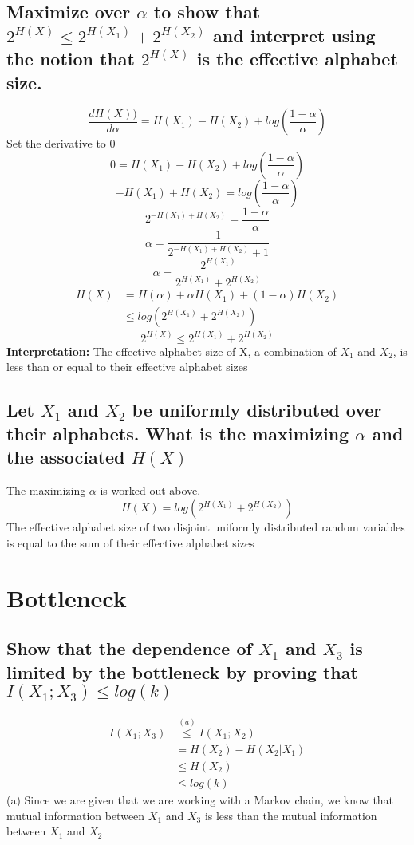 \documentclass[11pt, oneside]{book}   	%
\begin{document}
\subsection{Maximize over $\alpha$ to show that $2^{H(X)} \leq 2^{H(X_1)}+2^{H(X_2)}$ and interpret using the notion that $2^{H(X)}$ is the effective alphabet size.}

$$\frac{dH(X))}{d\alpha} = H(X_1)-H(X_2)+log(\frac{1-\alpha}{\alpha})$$
Set the derivative to 0
$$0 = H(X_1)-H(X_2)+log(\frac{1-\alpha}{\alpha})$$
$$-H(X_1)+H(X_2) = log(\frac{1-\alpha}{\alpha})$$
$$2^{-H(X_1)+H(X_2)} = \frac{1-\alpha}{\alpha}$$
$$\alpha = \frac{1}{2^{-H(X_1)+H(X_2)} + 1}$$
$$\alpha = \frac{2^{H(X_1)}}{2^{H(X_1)} + 2^{H(X_2)}}$$
\begin{equation}
\begin{split}
H(X) & = H(\alpha) + \alpha H(X_1) + (1-\alpha)H(X_2)\\
& \leq log(2^{H(X_1)} + 2^{H(X_2)})
\end{split}
\end{equation}
$$2^{H(X)} \leq 2^{H(X_1)} + 2^{H(X_2)}$$
\textbf{Interpretation:} The effective alphabet size of X, a combination of $X_1$ and $X_2$, is less than or equal to their effective alphabet sizes
\subsection{Let $X_1$ and $X_2$ be uniformly distributed over their alphabets.  What is the maximizing $\alpha$ and the associated $H(X)$}
The maximizing $\alpha$ is worked out above.
$$H(X) = log(2^{H(X_1)} + 2^{H(X_2)})$$
The effective alphabet size of two disjoint uniformly distributed random variables is equal to the sum of their effective alphabet sizes

\section{Bottleneck}
\subsection{Show that the dependence of $X_1$ and $X_3$ is limited by the bottleneck by proving that $I(X_1;X_3) \leq log(k)$}

\begin{equation}
\begin{split}
I(X_1;X_3) & \overset{(a)}{\leq} I(X_1;X_2)\\
& = H(X_2) - H(X_2|X_1)\\
& \leq H(X_2)\\
& \leq log(k)
\end{split}
\end{equation}
(a) Since we are given that we are working with a Markov chain, we know that mutual information between $X_1$ and $X_3$ is less than the mutual information between $X_1$ and $X_2$
\end{document}
